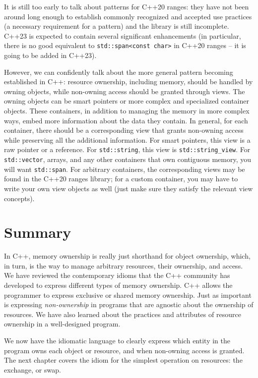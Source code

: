 It is still too early to talk about patterns for C++20 ranges: they have not been around long enough to establish commonly recognized and accepted use practices (a necessary requirement for a pattern) and the library is still incomplete. C++23 is expected to contain several significant enhancements (in particular, there is no good equivalent to \texttt{std::span\textless{}const\ char\textgreater{}} in C++20 ranges -- it is going to be added in C++23).

However, we can confidently talk about the more general pattern becoming established in C++: resource ownership, including memory, should be handled by owning objects, while non-owning access should be granted through views. The owning objects can be smart pointers or more complex and specialized container objects. These containers, in addition to managing the memory in more complex ways, embed more information about the data they contain. In general, for each container, there should be a corresponding view that grants non-owning access while preserving all the additional information. For smart pointers, this view is a raw pointer or a reference. For \texttt{std::string}, this view is \texttt{std::string\_view}. For \texttt{std::vector}, arrays, and any other containers that own contiguous memory, you will want \texttt{std::span}. For arbitrary containers, the corresponding views may be found in the C++20 ranges library; for a custom container, you may have to write your own view objects as well (just make sure they satisfy the relevant view concepts).

\section{Summary}

In C++, memory ownership is really just shorthand for object ownership, which, in turn, is the way to manage arbitrary resources, their ownership, and access. We have reviewed the contemporary idioms that the C++ community has developed to express different types of memory ownership. C++ allows the programmer to express exclusive or shared memory ownership. Just as important is expressing \emph{non-ownership} in programs that are agnostic about the ownership of resources. We have also learned about the practices and attributes of resource ownership in a well-designed program.

We now have the idiomatic language to clearly express which entity in the program owns each object or resource, and when non-owning access is granted. The next chapter covers the idiom for the simplest operation on resources: the exchange, or swap.

